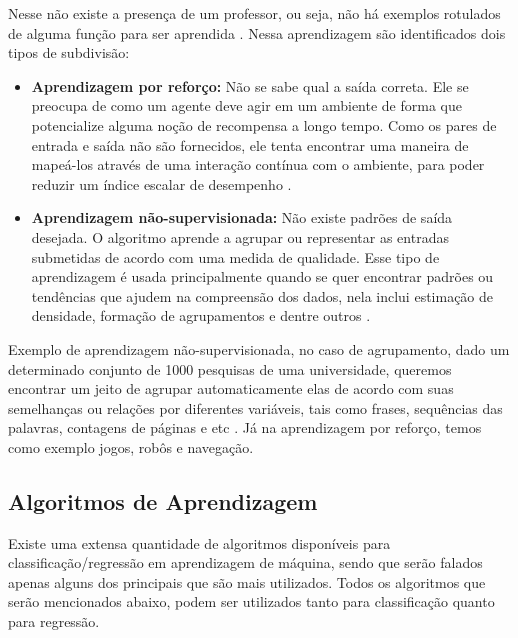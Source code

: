 \par
Nesse não existe a presença de um professor, ou seja, não há exemplos rotulados de alguma função para ser aprendida \cite{Lorena2007, Henke2011}. Nessa aprendizagem são identificados dois tipos de subdivisão:

\begin{itemize}
    \item \textbf{Aprendizagem por reforço:} Não se sabe qual a saída correta. Ele se preocupa de como um agente deve agir em um ambiente de forma que potencialize alguma noção de recompensa a longo tempo. Como os pares de entrada e saída não são fornecidos, ele tenta encontrar uma maneira de mapeá-los através de uma interação contínua com o ambiente, para poder reduzir um índice escalar de desempenho \cite{Henke2011, Alpaydin2009}. 
    \item \textbf{Aprendizagem não-supervisionada:} Não existe padrões de saída desejada. O algoritmo aprende a agrupar ou representar as entradas submetidas de acordo com uma medida de qualidade. Esse tipo de aprendizagem é usada principalmente quando se quer encontrar padrões ou tendências que ajudem na compreensão dos dados, nela inclui estimação de densidade, formação de agrupamentos e dentre outros \cite{Henke2011, Lorena2007}.
\end{itemize}

\par
Exemplo de aprendizagem não-supervisionada, no caso de agrupamento, dado um determinado conjunto de 1000 pesquisas de uma universidade, queremos encontrar um jeito de agrupar automaticamente elas de acordo com suas semelhanças ou relações por diferentes variáveis, tais como frases, sequências das palavras, contagens de páginas e etc \cite{Pedro}. Já na aprendizagem por reforço, temos como exemplo jogos, robôs e navegação.


\subsection{Algoritmos de Aprendizagem}

\par
Existe uma extensa quantidade de algoritmos disponíveis para classificação/regressão em aprendizagem de máquina, sendo que serão falados apenas alguns dos principais que são mais utilizados. Todos os algoritmos que serão mencionados abaixo, podem ser utilizados tanto para classificação quanto para regressão. %


